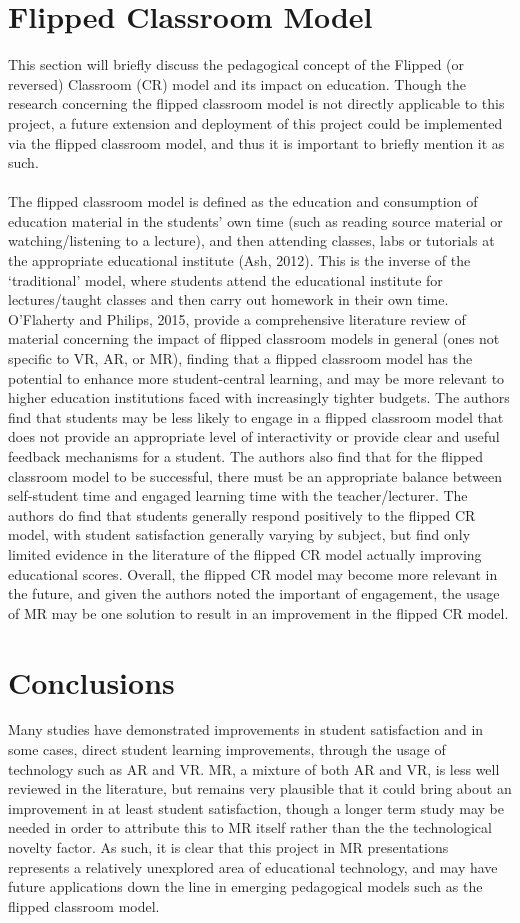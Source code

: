 \documentclass[11pt]{report}
\begin{document}
\section{Flipped Classroom Model}
This section will briefly discuss the pedagogical concept of the Flipped (or reversed) Classroom (CR) model and its impact on education. Though the research concerning the flipped classroom model is not directly applicable to this project, a future extension and deployment of this project could be implemented via the flipped classroom model, and thus it is important to briefly mention it as such.\\~\\
The flipped classroom model is defined as the education and consumption of education material in the students' own time (such as reading source material or watching/listening to a lecture), and then attending classes, labs or tutorials at the appropriate educational institute (Ash, 2012\cite{Ash2012}). This is the inverse of the `traditional' model, where students attend the educational institute for lectures/taught classes and then carry out homework in their own time. O'Flaherty and Philips, 2015\cite{OFlaherty2015}, provide a comprehensive literature review of material concerning the impact of flipped classroom models in general (ones not specific to VR, AR, or MR), finding that a flipped classroom model has the potential to enhance more student-central learning, and may be more relevant to higher education institutions faced with increasingly tighter budgets. The authors find that students may be less likely to engage in a flipped classroom model that does not provide an appropriate level of interactivity or provide clear and useful feedback mechanisms for a student. The authors also find that for the flipped classroom model to be successful, there must be an appropriate balance between self-student time and engaged learning time with the teacher/lecturer. The authors do find that students generally respond positively to the flipped CR model, with student satisfaction generally varying by subject, but find only limited evidence in the literature of the flipped CR model actually improving educational scores. Overall, the flipped CR model may become more relevant in the future, and given the authors noted the important of engagement, the usage of MR may be one solution to result in an improvement in the flipped CR model.
\section{Conclusions}
Many studies have demonstrated improvements in student satisfaction and in some cases, direct student learning improvements, through the usage of technology such as AR and VR. MR, a mixture of both AR and VR, is less well reviewed in the literature, but remains very plausible that it could bring about an improvement in at least student satisfaction, though a longer term study may be needed in order to attribute this to MR itself rather than the the technological novelty factor. As such, it is clear that this project in MR presentations represents a relatively unexplored area of educational technology, and may have future applications down the line in emerging pedagogical models such as the flipped classroom model.
\end{document}
